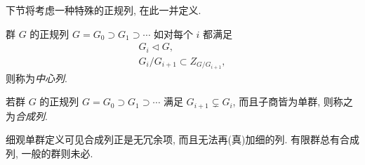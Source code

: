 下节将考虑一种特殊的正规列, 在此一并定义.
\begin{definition}[中心列]\label{def:central-series}
	群 $G$ 的正规列 $G = G_0 \supset G_1 \supset \cdots$ 如对每个 $i$ 都满足
	\begin{gather*}
		G_i \lhd G, \\
		G_i/G_{i+1} \subset Z_{G/G_{i+1}},
	\end{gather*}
	则称为\emph{中心列}.
\end{definition}

\begin{definition}[合成列]\label{def:composition-series}
	若群 $G$ 的正规列 $G = G_0 \supset G_1 \supset \cdots$ 满足 $G_{i+1} \subsetneq G_i$, 而且子商皆为单群, 则称之为\emph{合成列}.
\end{definition}
细观单群定义可见合成列正是无冗余项, 而且无法再(真)加细的列. 有限群总有合成列, 一般的群则未必.


